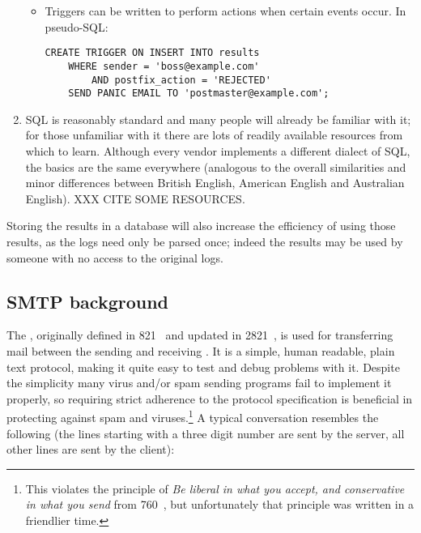 \documentclass[a4paper,12pt,draft]{article}
\begin{document}
\begin{enumerate}
\begin{itemize}
            \item Triggers can be written to perform actions when certain
                events occur.  In pseudo-SQL\@:

\begin{verbatim}
CREATE TRIGGER ON INSERT INTO results
    WHERE sender = 'boss@example.com'
        AND postfix_action = 'REJECTED'
    SEND PANIC EMAIL TO 'postmaster@example.com';
\end{verbatim}

        \end{itemize}


    \item SQL is reasonably standard and many people will already be
        familiar with it; for those unfamiliar with it there are lots of
        readily available resources from which to learn.  Although every
        vendor implements a different dialect of SQL, the basics are the
        same everywhere (analogous to the overall similarities and minor
        differences between British English, American English and
        Australian English).  XXX CITE SOME RESOURCES\@.

\end{enumerate}

Storing the results in a database will also increase the efficiency of
using those results, as the logs need only be parsed once; indeed the
results may be used by someone with no access to the original logs.



\subsection{SMTP background}
\label{SMTP background}

The \SMTPlong, originally defined in \RFC{} 821~\cite{RFC821} and updated
in \RFC{} 2821~\cite{RFC2821}, is used for transferring mail between the
sending and receiving \MTA\@.  It is a simple, human readable, plain text
protocol, making it quite easy to test and debug problems with it.  Despite
the simplicity many virus and/or spam sending programs fail to implement it
properly, so requiring strict adherence to the protocol specification is
beneficial in protecting against spam and viruses.\footnote{This violates
the principle of \textit{Be liberal in what you accept, and conservative in
what you send\/} from \RFC{} 760~\cite{rfc760}, but unfortunately that
principle was written in a friendlier time.}  A typical \SMTP{}
conversation resembles the following (the lines starting with a three digit
number are sent by the server, all other lines are sent by the client):
\end{document}
